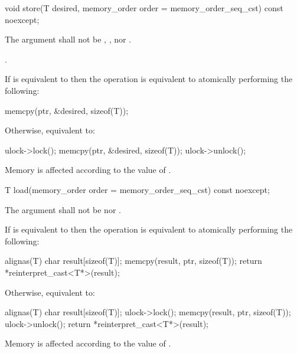 \begin{itemdecl}
void store(T desired, memory_order order = memory_order_seq_cst) const noexcept;
\end{itemdecl}

\begin{itemdescr}
\pnum
\removed{\requires}\added{\expects} The  argument shall not be
,
, nor
.

\pnum
{}.
\begin{addedblock}
\effects If  is equivalent to 
then the operation is equivalent to atomically performing the following:
\begin{codeblock}
  memcpy(ptr, &desired, sizeof(T));
\end{codeblock}
Otherwise, equivalent to:
\begin{codeblock}
  ulock->lock();
  memcpy(ptr, &desired, sizeof(T));
  ulock->unlock();
\end{codeblock}
\end{addedblock}
Memory is affected according to the value of .
\end{itemdescr}


\begin{itemdecl}
T load(memory_order order = memory_order_seq_cst) const noexcept;
\end{itemdecl}

\begin{itemdescr}
\pnum
\removed{\requires}\added{\expects} The  argument shall not be
 nor .

\begin{addedblock}
\pnum
\effects If  is equivalent to  then the
operation is equivalent to atomically performing the following:
\begin{codeblock}
  alignas(T) char result[sizeof(T)];
  memcpy(result, ptr, sizeof(T));
  return *reinterpret_cast<T*>(result);
\end{codeblock}
Otherwise, equivalent to:
\begin{codeblock}
  alignas(T) char result[sizeof(T)];
  ulock->lock();
  memcpy(result, ptr, sizeof(T));
  ulock->unlock();
  return *reinterpret_cast<T*>(result);
\end{codeblock}
\end{addedblock}
Memory is affected according to the value of .

\end{itemdescr}


